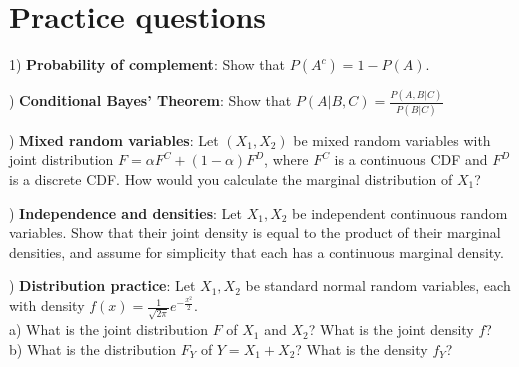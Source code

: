 \documentclass[12pt,english]{article}
\begin{document}
\section{Practice questions}

1) \textbf{Probability of complement}: Show that $P(A^{c}) = 1 - P(A)$.

\vspace{1em}
) \textbf{Conditional Bayes' Theorem}: Show that $P(A | B, C) = \frac{P(A, B | C)}{P(B | C)}$

\vspace{1em}
) \textbf{Mixed random variables}: Let $(X_{1}, X_{2})$ be mixed random variables with joint distribution $F = \alpha F^{C} + (1 - \alpha) F^{D}$, where $F^{C}$ is a continuous CDF and $F^{D}$ is a discrete CDF. How would you calculate the marginal distribution of $X_{1}$?

\vspace{1em}
) \textbf{Independence and densities}: Let $X_{1}, X_{2}$ be independent continuous random variables. Show that their joint density is equal to the product of their marginal densities, and assume for simplicity that each has a continuous marginal density.

\vspace{1em}
) \textbf{Distribution practice}: Let $X_{1}, X_{2}$ be standard normal random variables, each with density $f(x) = \frac{1}{\sqrt{2\pi}} e^{-\frac{x^{2}}{2}}$. \\
a) What is the joint distribution $F$ of $X_{1}$ and $X_{2}$? What is the joint density $f$? \\
b) What is the distribution $F_{Y}$ of $Y = X_{1} + X_{2}$? What is the density $f_{Y}$? \\
\end{document}
